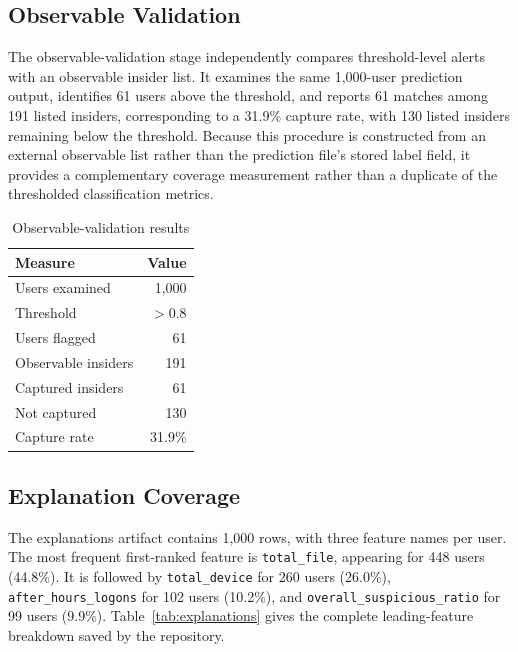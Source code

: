\subsection{Observable Validation}
The observable-validation stage independently compares threshold-level alerts with an observable insider list. It examines the same 1,000-user prediction output, identifies 61 users above the threshold, and reports 61 matches among 191 listed insiders, corresponding to a 31.9\% capture rate, with 130 listed insiders remaining below the threshold. Because this procedure is constructed from an external observable list rather than the prediction file's stored label field, it provides a complementary coverage measurement rather than a duplicate of the thresholded classification metrics.

\begin{table}[t]
\caption{Observable-validation results}
\label{tab:observable}
\centering
\footnotesize
\begin{tabular}{lr}
\toprule
Measure & Value \\
\midrule
Users examined & 1,000 \\
Threshold & $>0.8$ \\
Users flagged & 61 \\
Observable insiders & 191 \\
Captured insiders & 61 \\
Not captured & 130 \\
Capture rate & 31.9\% \\
\bottomrule
\end{tabular}
\end{table}

\subsection{Explanation Coverage}
The explanations artifact contains 1,000 rows, with three feature names per user. The most frequent first-ranked feature is \texttt{total\_file}, appearing for 448 users (44.8\%). It is followed by \texttt{total\_device} for 260 users (26.0\%), \texttt{after\_hours\_logons} for 102 users (10.2\%), and \texttt{overall\_suspicious\_ratio} for 99 users (9.9\%). Table~\ref{tab:explanations} gives the complete leading-feature breakdown saved by the repository.

